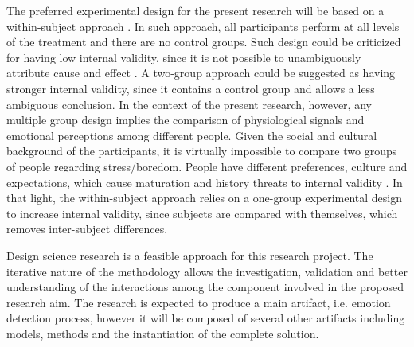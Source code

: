 The preferred experimental design for the present research will be based on a within-subject approach \parencite{lane2015online}. In such approach, all participants perform at all levels of the treatment and there are no control groups.
Such design could be criticized for having low internal validity, since it is not possible to unambiguously attribute cause and effect \parencite{kirk1982experimental}. A two-group approach could be suggested as having stronger internal validity, since it contains a control group and allows a less ambiguous conclusion. In the context of the present research, however, any multiple group design implies the comparison of physiological signals and emotional perceptions among different people. Given the social and cultural background of the participants, it is virtually impossible to compare two groups of people regarding stress/boredom. People have different preferences, culture and expectations, which cause maturation and history threats to internal validity \parencite{trochim2001research}.
In that light, the within-subject approach relies on a one-group experimental design to increase internal validity, since subjects are compared with themselves, which removes inter-subject differences.

Design science research is a feasible approach for this research project. The iterative nature of the methodology allows the investigation, validation and better understanding of the interactions among the component involved in the proposed research aim. The research is expected to produce a main artifact, i.e. emotion detection process, however it will be composed of several other artifacts including models, methods and the instantiation of the complete solution.


